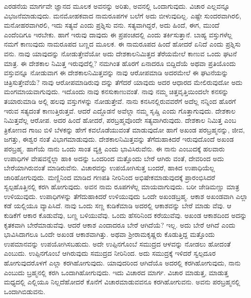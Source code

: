 ಎರಡನೆಯ ಮಾರ್ಗವೇ ಜ್ಞಾನದ ಮೂಲಕ ಅವನನ್ನು ಅರಿತು, ಅವನಲ್ಲಿ ಒಂದಾಗುವುದು. ವಿಚಾರ ಎಲ್ಲವನ್ನೂ ವಿಭಜನೆಮಾಡುವುದು. ಮನಮೋಹಕವಾದ ನಾಮರೂಪಗಳ ಬಲೆಗೆ ಅದು ಬೀಳುವುದಿಲ್ಲ. ಎಷ್ಟೇ ಸುಂದರವಾಗಿರಲಿ, ಮನೋಹರವಾಗಿರಲಿ, ಇದು ಸತ್ಯವೆ ಎಂದು ಪ್ರಶ್ನಿಸು ವನು. ಸತ್ಯವಾಗಿದ್ದರೆ, ಅದು ಹಿಂದೆ, ಈಗ, ಮುಂದೆ ಎಂದೆಂದಿಗೂ ಇರಬೇಕು. ಹಾಗೆ ಇರುವು ದಾವುದು ಈ ಪ್ರಪಂಚದಲ್ಲಿ ಎಂದು ತರ್ಕಿಸುತ್ತಾನೆ. ಬಾಹ್ಯ ವಸ್ತುಗಳೆಲ್ಲ ನಮಗೆ ಕಾಣುವುದು ನಾಮರೂಪದ ಬಣ್ಣದ ಮೂಲಕ. ಈ ನಾಮರೂಪದ ಹಿಂದೆ ಹೋದರೆ ಏನಿದೆ ಎಂದು ಪ್ರಶ್ನಿಸು ವನು. ನಾವು ಯಾವುದನ್ನು ನೋಡುತ್ತೇವೆಯೋ ಅದು ದೇಶಕಾಲನಿಮಿತ್ತದ ತೆರೆಯಮೇಲೆ ಕಾಣುವ ಒಂದು ಘಟನೆ ಮಾತ್ರ. ಈ ದೇಶಕಾಲ ನಿಮಿತ್ತ ಇರುವುದೆಲ್ಲಿ? ನಮಗಿಂತ ಹೊರಗೆ ಏನಾದರೂ ಬಿದ್ದಿದೆಯೆ ಅಥವಾ ಪ್ರತಿಯೊಂದು ವಸ್ತುವನ್ನೂ ನೋಡುವಾಗ ಈ ದೇಶಕಾಲನಿಮಿತ್ತವನ್ನು ನಾವು ಆರೋಪಮಾಡಿ ಅದರಮೇಲೆ ಈ ಘಟನೆಯನ್ನು ಚಿತ್ರಿಸುತ್ತೇವೆಯೆ? ನಾವು ಆರೋಪಮಾಡಿರುವು ದನ್ನು ತೆಗೆದರೆ ಯಾವುದು ಅದರ ಆಧಾರದ ಮೇಲಿರುವುದೋ ಅದು ಮಂಗಮಾಯವಾಗುವುದು. ಇದೊಂದು ನಾವು ಕನಸುಕಾಣುವಂತೆ. ನಾವು ನಮ್ಮ ಚಿತ್ತವೃತ್ತಿಯಿಂದಲೇ ಕನಸನ್ನು ತಯಾರುಮಾಡಿ ಅಲ್ಲಿ ಹಲವು ವಸ್ತುಗಳನ್ನು ನೋಡುತ್ತೇವೆ. ನಾನು ಕನಸಿನಲ್ಲಿರುವವರೆಗೆ ಅದೆಲ್ಲ ನನ್ನಿಂದ ಹೊರಗೆ ಇರುವ ಸತ್ಯದಂತೆ ಕಾಣುತ್ತಿರುತ್ತವೆ. ಆದರೆ ಎದ್ದೊಡನೆ ಅವೆಲ್ಲಾ ನಮ್ಮ ಸೃಷ್ಚಿ ಎಂದು ಗೊತ್ತಾಗುವುದು. ದೇಶಕಾಲ ನಿಮಿತ್ತವೆಲ್ಲ ಆರೋಪ. ಅದರ ಹಿಂದೆ ಹೋದರೆ, ಪರಬ್ರಹ್ಮವೊಂದೇ ಸತ್ಯವಾಗಿರುವುದು. ದೇಶಕಾಲ ನಿಮಿತ್ತ ಎಂಬ ತ್ರಿಕೋಣದ ಗಾಜು ಬಿಳಿ ಬೆಳಕನ್ನು ಹೇಗೆ ಕವಲೊಡೆಯುವಂತೆ ಮಾಡುವುದೋ ಹಾಗೆ ಅಖಂಡ ಪರಬ್ರಹ್ಮನನ್ನು, ಜೀವ, ಜಗತ್ತು, ಈಶ್ವರ ನಂತೆ ವಿಭಾಗಮಾಡುವುದು. ದೇಶಕಾಲನಿಮಿತ್ತವನ್ನು ತೆಗೆದುಹಾಕಿದರೆ ಇರುವುದೊಂದೆ ಅಖಂಡ ಪರಬ್ರಹ್ಮ. ಹಾಗೆಯೆ ನಾನು ಒಂದು ಸಾಂತ ವ್ಯಕ್ತಿ ಎಂದು ಭಾವಿಸಿರುವೆನು. ಈ ನಾನು ಎಂಬುದಕ್ಕೆ ಹಲವಾರು ಉಪಾಧಿಗಳ ವೇಷವನ್ನೆಲ್ಲಾ ಹಾಕಿ ಅದನ್ನು ಒಂದರಿಂದ ಮತ್ತೊಂದು ಬೇರೆ ಆಗಿರು ವಂತೆ, ದೇವರಿಂದ ಅದು ಬೇರೆಯಾಗಿರುವಂತೆ ಮಾಡಿರುವೆನು. ವಿಚಾರವನ್ನು ಉಪಯೋಗಿಸುತ್ತ ಬಂದರೆ, ಹಾಕಿದ ಉಪಾಧಿಯೆಲ್ಲ ಜಾರಿಹೋಗುವುದು. ಮಣ್ಣಿನಿಂದ ಮಾಡಿದ ಗಣಪತಿ ನೀರಿನಿಂದ ಅಭಿಷೇಕಮಾಡುವುದಕ್ಕೆ ಪ್ರಾರಂಭಿಸಿದರೆ ಸ್ವಲ್ಪಹೊತ್ತಿನಲ್ಲಿ ಕರಗಿ ಹೋಗುವುದು. ಅವನ ನಾಮ ರೂಪಗಳೆಲ್ಲ ಮಾಯವಾಗುವುದು. ಬರೀ ಜೇಡಿಮಣ್ಣು ಮಾತ್ರ ಉಳಿಯುವುದು. ಉಪಾಧಿಗಳನ್ನು ತೆಗೆದುಹಾಕಿದರೆ ಉಳಿಯುವುದು ಒಂದೇ ಅಖಂಡಬ್ರಹ್ಮ. ಆಕಾಶ ಅಖಂಡವಾಗಿ ಎಲ್ಲಾ ಕಡೆ ಯಲ್ಲಿಯೂ ವ್ಯಾಪಿಸಿದೆ. ನಾವು ಒಂದು ಸಣ್ಣ ಕುಡಿಕೆಮಾಡಿ ಅದರಲ್ಲಿ ಆಕಾಶವನ್ನು ಬೇರೆ ಮಾಡು ವೆವು. ಆ ಕುಡಿಕೆಗೆ ಆಕಾರ ಕೊಡುವೆವು, ಬಣ್ಣ ಬಳಿಯುವೆವು. ಒಂದು ಹೆಸರಿನಿಂದ ಕರೆಯುವೆವು. ಅಖಂಡ ಆಕಾಶದಿಂದ ಅದನ್ನು ಕೃತಕವಾಗಿ ಬೇರೆಮಾಡುವೆವು. ಆದರೆ ಆಕಾಶ ಎಂದಾದರೂ ಬೇರೆ ಆಗಿದೆಯೆ? ಇಲ್ಲ. ಅದು ಬೇರೆ ಆಗಿದೆ ಎಂದು ಭಾವಿಸಿದಾಗಲೂ ಒಂದೇ ಅಖಂಡ ಆಕಾಶವಾಗಿತ್ತು. ಅಥವಾ ಶ‍್ರೀರಾಮಕೃಷ್ಣರು ಕೊಡುತ್ತಿದ್ದ ಮತ್ತೊಂದು ಉಪಮಾನವನ್ನು ಉಪಯೋಗಿಸಬಹುದು. ಅದೇ ಉಪ್ಪಿನಗೊಂಬೆ ಸಮುದ್ರದ ಆಳವನ್ನು ನೋಡಲು ಹೋದಂತೆ ಎಂಬುದು. ಉಪ್ಪಿನಗೊಂಬೆ ಆಗಿರುವುದು ಸಮುದ್ರದ ನೀರಿನಿಂದ. ಅದು ಸಮುದ್ರಕ್ಕೆ ಇಳಿದರೆ ಸ್ವಲ್ಪದೂರ ಹೋಗುವುದರೊಳಗೆ ಎಲ್ಲಾ ಕರಗಿಹೋಗುವುದು. ಯಾವುದರಿಂದ ಆಗಿದೆಯೊ ಅದರಲ್ಲಿ ಕರಗಿಹೋಗುವುದು, ನಾನು ಎಂಬುದು ಬ್ರಹ್ಮನಲ್ಲಿ ಕರಗಿ ಒಂದಾಗಿಹೋಗುವುದು. ಇದು ವಿಚಾರದ ಮಾರ್ಗ. ವಿಚಾರ ಮಾಡುತ್ತ, ಮಾಡುತ್ತ ಮಧ್ಯದಲ್ಲಿ ಎಲ್ಲಿಯೂ ನಿಲ್ಲದೆಹೋದರೆ ಕೊನೆಗೆ ವಿಚಾರಮಾಡುವವನೂ ಕರಗಿಹೋಗುವನು. ಅವನು ಪರಬ್ರಹ್ಮನಲ್ಲಿ ಒಂದಾಗಿಬಿಡುವನು.

